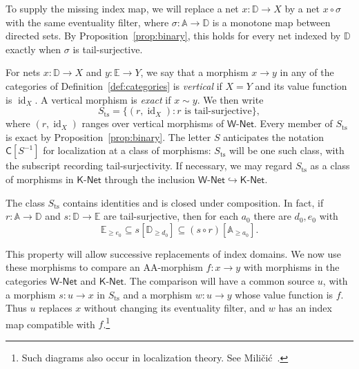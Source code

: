 \documentclass[11pt,a4paper]{article}
\theoremstyle{definition}
\theoremstyle{remark}
\newcommand{\Wpar}{\mathsf{W\text{-}Net}}
\newcommand{\Kpar}{\mathsf{K\text{-}Net}}
\newcommand{\CC}{\mathsf C}
\newcommand{\id}{\operatorname{id}}
\newcommand{\Sts}{S_{\mathrm{ts}}}
\begin{document}
To supply the missing index map, we will replace a net
\(x:\mathbb D\to X\) by a net \(x\circ\sigma\) with the same
eventuality filter, where \(\sigma:\mathbb A\to\mathbb D\) is a
monotone map between directed sets. By Proposition~\ref{prop:binary},
this holds for every net indexed by \(\mathbb D\) exactly when
\(\sigma\) is tail-surjective.

For nets \(x:\mathbb D\to X\) and \(y:\mathbb E\to Y\), we say that a morphism
\(x\to y\) in any of the categories of Definition~\ref{def:categories}
is \emph{vertical} if \(X=Y\) and its value function is \(\id_X\).
A vertical morphism is \emph{exact} if \(x\sim y\). We then write
\begin{equation}\label{eq:sts}
 \Sts=\{(r,\id_X):r\text{ is tail-surjective}\},
\end{equation}
where \((r,\id_X)\) ranges over vertical morphisms of \(\Wpar\).
Every member of \(\Sts\) is exact by
Proposition~\ref{prop:binary}. The letter \(S\) anticipates the
notation \(\CC[S^{-1}]\) for localization at a class of morphisms:
\(\Sts\) will be one such class, with the subscript recording
tail-surjectivity. If necessary, we may regard \(\Sts\) as a class
of morphisms in \(\Kpar\) through the inclusion
\(\Wpar\hookrightarrow\Kpar\).

The class \(\Sts\) contains identities and is closed under
composition. In fact, if \(r:\mathbb A\to\mathbb D\) and
\(s:\mathbb D\to\mathbb E\) are tail-surjective, then for each
\(a_0\) there are \(d_0,e_0\) with
\[
 \mathbb E_{\ge e_0}\subseteq s[\mathbb D_{\ge d_0}]
                  \subseteq(s\circ r)[\mathbb A_{\ge a_0}].
\]

This property will allow successive replacements of index domains.
We now use these morphisms to compare an AA-morphism \(f:x\to y\)
with morphisms in the categories \(\Wpar\) and \(\Kpar\). The comparison will have
a common source \(u\), with a morphism \(s:u\to x\) in \(\Sts\) and
a morphism \(w:u\to y\) whose value function is \(f\).
Thus \(u\) replaces \(x\) without changing its eventuality filter,
and \(w\) has an index map compatible with \(f\).\footnote{Such diagrams
also occur in localization theory. See Mili\v{c}i\'c~\cite[Chapter 1, Section 1.3]{Milicic}.}
\end{document}

